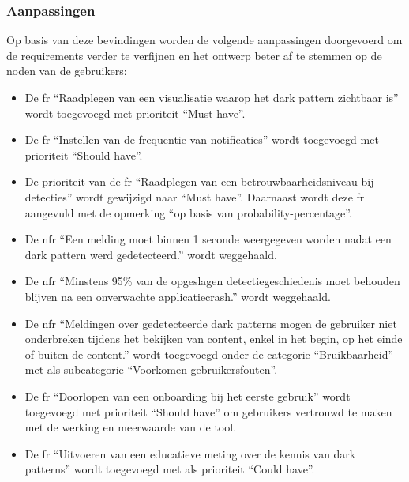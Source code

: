 \vspace{1em}

\subsubsection{Aanpassingen}

\vspace{1em}

Op basis van deze bevindingen worden de volgende aanpassingen doorgevoerd om de requirements verder te verfijnen en het ontwerp beter af te stemmen op de noden van de gebruikers:

\begin{itemize}
    \item De \acrshort{fr} ``Raadplegen van een visualisatie waarop het dark pattern zichtbaar is'' wordt toegevoegd met prioriteit ``Must have''.
    \item De \acrshort{fr} ``Instellen van de frequentie van notificaties'' wordt toegevoegd met prioriteit ``Should have''.
    \item De prioriteit van de \acrshort{fr} ``Raadplegen van een betrouwbaarheidsniveau bij detecties'' wordt gewijzigd naar ``Must have''. Daarnaast wordt deze \acrshort{fr} aangevuld met de opmerking ``op basis van probability-percentage''.
    \item De \acrshort{nfr} ``Een melding moet binnen 1 seconde weergegeven worden nadat een dark pattern werd gedetecteerd.'' wordt weggehaald.
    \item De \acrshort{nfr} ``Minstens 95\% van de opgeslagen detectiegeschiedenis moet behouden blijven na een onverwachte applicatiecrash.'' wordt weggehaald.
    \item De \acrshort{nfr} ``Meldingen over gedetecteerde dark patterns mogen de gebruiker niet onderbreken tijdens het bekijken van content, enkel in het begin, op het einde of buiten de content.'' wordt toegevoegd onder de categorie ``Bruikbaarheid'' met als subcategorie ``Voorkomen gebruikersfouten''.
    \item De \acrshort{fr} ``Doorlopen van een onboarding bij het eerste gebruik'' wordt toegevoegd met prioriteit ``Should have'' om gebruikers vertrouwd te maken met de werking en meerwaarde van de tool.
    \item De \acrshort{fr} ``Uitvoeren van een educatieve meting over de kennis van dark patterns'' wordt toegevoegd met als prioriteit ``Could have''.
\end{itemize}

\newpage

